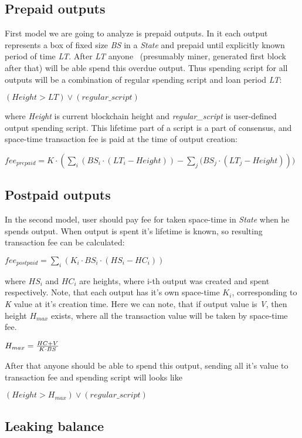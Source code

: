 \documentclass[]{article}   %
\newcommand{\state}{\textit{State}}
\begin{document}
\subsection{Prepaid outputs}

First model we are going to analyze is prepaid outputs. In it each output represents a box of fixed size \textit{BS} in a \state{} and prepaid until explicitly known period of time \textit{LT}. After \textit{LT} anyone ~(presumably miner, generated first block after that) will be able spend this overdue output. Thus spending script for all outputs will be a combination of regular spending script and loan period \textit{LT}:

$(Height > LT) \lor (regular\_script)$

where \textit{Height} is current blockchain height and \textit{regular\_script} is user-defined output spending script. This lifetime part of a script is a part of consensus, and space-time transaction fee is paid at the time of output creation:

$fee_{prepaid} = K \cdot (\sum_i{(BS_i \cdot (LT_i - Height))} - \sum_j{(BS_j \cdot (LT_j - Height)}))$

\subsection{Postpaid outputs}

In the second model, user should pay fee for taken space-time in \state{} when he spends output. When output is spent it's lifetime is known, so resulting transaction fee can be calculated:

$fee_{postpaid} = \sum_i{(K_i \cdot BS_i \cdot (HS_i - HC_i))}$

where \textit{$HS_i$} and \textit{$HC_i$} are heights, where i-th output was created and spent respectively. Note, that each output has it's own space-time \textit{$K_i$}, corresponding to \textit{K} value at it's creation time. Here we can note, that if output value is \textit{V}, then height \textit{$H_{max}$} exists, where all the transaction value will be taken by space-time fee.

$H_{max} = {{HC + V} \over {K \cdot BS}}$

After that anyone should be able to spend this output, sending all it's value to transaction fee and spending script will looks like

$(Height > H_{max}) \lor (regular\_script)$

\subsection{Leaking balance}
\end{document}
